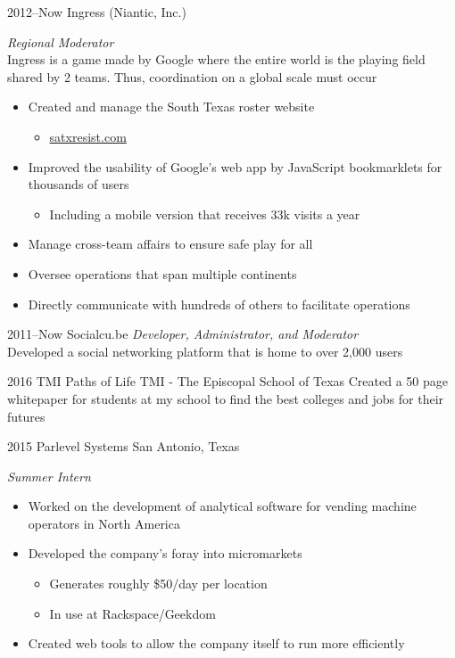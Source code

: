 \documentclass[]{friggeri-cv} %
\begin{document}
\begin{entrylist}

	\entry
	{2012--Now}
	{Ingress (Niantic, Inc.)}
	{}
	{\emph{Regional Moderator} \\
		Ingress is a game made by Google where the entire world is the playing field shared by 2 teams. Thus, coordination on a global scale must occur
		\begin{itemize}
			\item Created and manage the South Texas roster website
				\begin{itemize}
					\item \href{http://satxresist.com}{satxresist.com}
				\end{itemize}
			\item Improved the usability of Google's web app by JavaScript bookmarklets for thousands of users
				\begin{itemize}
					\item Including a mobile version that receives 33k visits a year
				\end{itemize}
			\item Manage cross-team affairs to ensure safe play for all
			\item Oversee operations that span multiple continents
			\item Directly communicate with hundreds of others to facilitate operations
		\end{itemize}
	}

	\entry
	{2011--Now}
	{Socialcu.be}
	{}
	{\emph{Developer, Administrator, and Moderator} \\
	Developed a social networking platform that is home to over 2,000 users}


	\entry
	{2016}
	{TMI Paths of Life}
	{TMI - The Episcopal School of Texas}
	{Created a 50 page whitepaper for students at my school to find the best colleges and jobs for their futures}


	\entry
	{2015}
	{Parlevel Systems}
	{San Antonio, Texas}
	{\emph{Summer Intern}
		\begin{itemize}
			\item Worked on the development of analytical software for vending machine operators in North America
			\item Developed the company's foray into micromarkets
				\begin{itemize}
					\item Generates roughly \$50/day per location
					\item In use at Rackspace/Geekdom
				\end{itemize}
			\item Created web tools to allow the company itself to run more efficiently
		\end{itemize}
	}


\end{entrylist}
\end{document}
